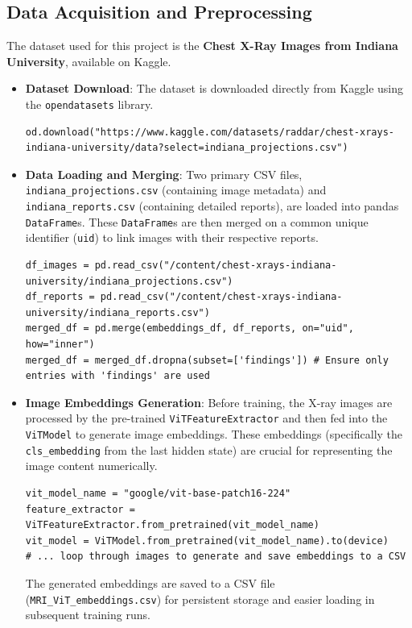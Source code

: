 \documentclass[a4paper, 12pt]{article}
\begin{document}
\subsection{Data Acquisition and Preprocessing}

The dataset used for this project is the \textbf{Chest X-Ray Images from Indiana University}, available on Kaggle.

\begin{itemize}
    \item \textbf{Dataset Download}: The dataset is downloaded directly from Kaggle using the \texttt{opendatasets} library.
    \begin{lstlisting}[breaklines=true]
od.download("https://www.kaggle.com/datasets/raddar/chest-xrays-indiana-university/data?select=indiana_projections.csv")
    \end{lstlisting}
    \item \textbf{Data Loading and Merging}: Two primary CSV files, \texttt{indiana\_projections.csv} (containing image metadata) and \texttt{indiana\_reports.csv} (containing detailed reports), are loaded into pandas \texttt{DataFrame}s. These \texttt{DataFrame}s are then merged on a common unique identifier (\texttt{uid}) to link images with their respective reports.
    \begin{lstlisting}[breaklines=true]
df_images = pd.read_csv("/content/chest-xrays-indiana-university/indiana_projections.csv")
df_reports = pd.read_csv("/content/chest-xrays-indiana-university/indiana_reports.csv")
merged_df = pd.merge(embeddings_df, df_reports, on="uid", how="inner")
merged_df = merged_df.dropna(subset=['findings']) # Ensure only entries with 'findings' are used
    \end{lstlisting}
    \item \textbf{Image Embeddings Generation}: Before training, the X-ray images are processed by the pre-trained \texttt{ViTFeatureExtractor} and then fed into the \texttt{ViTModel} to generate image embeddings. These embeddings (specifically the \texttt{cls\_embedding} from the last hidden state) are crucial for representing the image content numerically.
    \begin{lstlisting}[breaklines=true]
vit_model_name = "google/vit-base-patch16-224"
feature_extractor = ViTFeatureExtractor.from_pretrained(vit_model_name)
vit_model = ViTModel.from_pretrained(vit_model_name).to(device)
# ... loop through images to generate and save embeddings to a CSV
    \end{lstlisting}
    The generated embeddings are saved to a CSV file (\texttt{MRI\_ViT\_embeddings.csv}) for persistent storage and easier loading in subsequent training runs.


\end{itemize}
\end{document}
